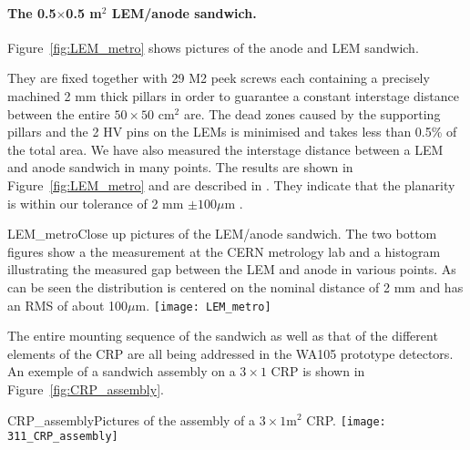 \paragraph{The 0.5$\times$0.5 m$^2$ LEM/anode sandwich.}
Figure~\ref{fig:LEM_metro} shows pictures of the anode and LEM sandwich.  


They are fixed together with 29 M2 peek screws each containing a precisely machined 2 mm thick pillars in order to guarantee a
 constant interstage distance between the entire $50\times50$ cm$^2$ are.  The dead zones caused by the supporting pillars and the 2 HV
 pins on the LEMs is minimised and takes less than 0.5\% of the total area.  We have also measured the interstage distance between
 a LEM and anode sandwich in many points. The results are shown in Figure~\ref{fig:LEM_metro} and are described in \cite{EDMS_metro_lem_anode}. They indicate that the planarity is within our tolerance of 2 mm $\pm 100 \mu$m .


\begin{cdrfigure}{LEM_metro}{Close up pictures of the LEM/anode sandwich. The two
       bottom figures show a the measurement at the CERN metrology lab
       and a histogram illustrating the measured gap between the LEM
       and anode in various points. As can be seen the distribution is
       centered on the nominal distance of 2 mm and has an RMS of
       about 100$\mu$m.}
     \texttt{[image: LEM\_metro]}
\end{cdrfigure}

The entire mounting sequence of the sandwich as well as that of the different elements of the CRP are all being addressed in the  WA105 prototype detectors. An exemple of a sandwich assembly on a   $3\times1$ CRP is shown in Figure~\ref{fig:CRP_assembly}.

\begin{cdrfigure}{CRP_assembly}{Pictures of the assembly of a $3\times1$m$^2$ CRP.}
     \texttt{[image: 311\_CRP\_assembly]}  
\end{cdrfigure}